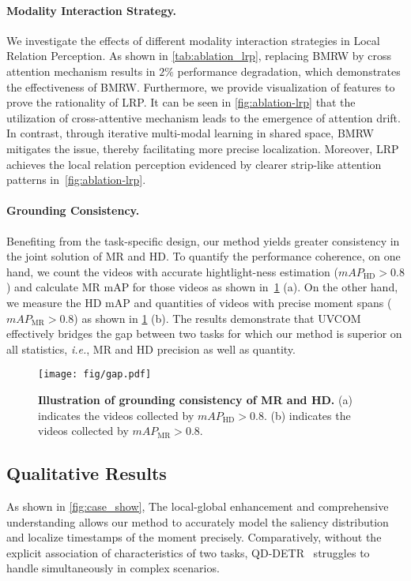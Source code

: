 \documentclass[10pt,twocolumn,letterpaper]{article}
\begin{document}
\vspace{-12pt}
\paragraph{Modality Interaction Strategy.}
We investigate the effects of different modality interaction strategies in Local Relation Perception. As shown in \cref{tab:ablation_lrp}, replacing BMRW by cross attention mechanism results in $2\%$ performance degradation, which demonstrates the effectiveness of BMRW.
Furthermore, we provide visualization of features to prove the rationality of LRP. It can be seen in \cref{fig:ablation-lrp} that the utilization of cross-attentive mechanism leads to the emergence of attention drift. In contrast, through iterative multi-modal learning in shared space, BMRW mitigates the issue, thereby facilitating more precise localization.
Moreover, LRP achieves the local relation perception evidenced by clearer strip-like attention patterns in~\cref{fig:ablation-lrp}.

\paragraph{Grounding Consistency.}
Benefiting from the task-specific design, our method yields greater consistency in the joint solution of MR and HD.
To quantify the performance coherence, on one hand, we count the videos with accurate hightlight-ness estimation ($mAP_{\text{HD}} > 0.8$) and calculate MR mAP for those videos as shown in~\cref{fig:gap} (a). 
On the other hand, we measure the HD mAP and quantities of videos with precise moment spans ($mAP_{\text{MR}} > 0.8$) as shown in \cref{fig:gap} (b). 
The results demonstrate that UVCOM effectively bridges the gap between two tasks for which our method is superior on all statistics, \textit{i.e.}, MR and HD precision as well as quantity.
\begin{figure}[t]
    \centering
    \texttt{[image: fig/gap.pdf]}
    \caption{\textbf{Illustration of grounding consistency of MR and HD.} (a) indicates the videos collected by $mAP_{\text{HD}} > 0.8$. (b) indicates the videos collected by $mAP_{\text{MR}} > 0.8$.}
    \label{fig:gap}
    \vspace{-10pt}
\end{figure}

\subsection{Qualitative Results}
As shown in \cref{fig:case_show}, The local-global enhancement and comprehensive understanding allows our method to accurately model the saliency distribution and localize timestamps of the moment precisely. Comparatively, without the explicit association of characteristics of two tasks, QD-DETR~\cite{qddetr} struggles to handle simultaneously in complex scenarios.  
\end{document}
